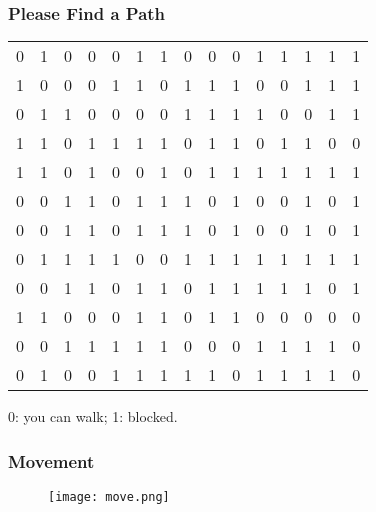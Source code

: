 \documentclass[11pt]{beamer}
\begin{document}
\begin{frame}
\frametitle{Please Find a Path}
\begin{center}
\begin{tabular}{|ccccccccccccccc|}
\hline
{\color{blue}0} & 1 & 0 & 0 & 0 & 1 & 1 & 0 & 0 & 0 & 1 & 1 & 1 & 1 & 1 \\
1 & 0 & 0 & 0 & 1 & 1 & 0 & 1 & 1 & 1 & 0 & 0 & 1 & 1 & 1 \\
0 & 1 & 1 & 0 & 0 & 0 & 0 & 1 & 1 & 1 & 1 & 0 & 0 & 1 & 1 \\
1 & 1 & 0 & 1 & 1 & 1 & 1 & 0 & 1 & 1 & 0 & 1 & 1 & 0 & 0 \\
1 & 1 & 0 & 1 & 0 & 0 & 1 & 0 & 1 & 1 & 1 & 1 & 1 & 1 & 1 \\
0 & 0 & 1 & 1 & 0 & 1 & 1 & 1 & 0 & 1 & 0 & 0 & 1 & 0 & 1 \\
0 & 0 & 1 & 1 & 0 & 1 & 1 & 1 & 0 & 1 & 0 & 0 & 1 & 0 & 1 \\
0 & 1 & 1 & 1 & 1 & 0 & 0 & 1 & 1 & 1 & 1 & 1 & 1 & 1 & 1 \\
0 & 0 & 1 & 1 & 0 & 1 & 1 & 0 & 1 & 1 & 1 & 1 & 1 & 0 & 1 \\
1 & 1 & 0 & 0 & 0 & 1 & 1 & 0 & 1 & 1 & 0 & 0 & 0 & 0 & 0 \\
0 & 0 & 1 & 1 & 1 & 1 & 1 & 0 & 0 & 0 & 1 & 1 & 1 & 1 & 0 \\
0 & 1 & 0 & 0 & 1 & 1 & 1 & 1 & 1 & 0 & 1 & 1 & 1 & 1 & {\color{blue}0} \\
\hline
\end{tabular}
\end{center}
0: you can walk; 1: blocked.
\end{frame}

\begin{frame}
\frametitle{Movement}
\begin{figure}
\centering
\texttt{[image: move.png]}
\end{figure}
\end{frame}
\end{document}
